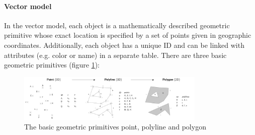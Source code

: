 



\paragraph{Vector model} %
\label{par:vector_model}

In the vector model, each object is a mathematically described geometric primitive whose exact location is specified by a set of points given in geographic coordinates. Additionally, each object has a unique ID and can be linked with attributes (e.g. color or name) in a separate table. There are three basic geometric primitives (figure \ref{fig:geometric_primitives}):

\begin{figure}[ht]
  \centering
  \includegraphics[width=0.8\textwidth]{graphics/basics/geometric_primitives}
  \caption{The basic geometric primitives point, polyline and polygon}
  \label{fig:geometric_primitives}
\end{figure}

